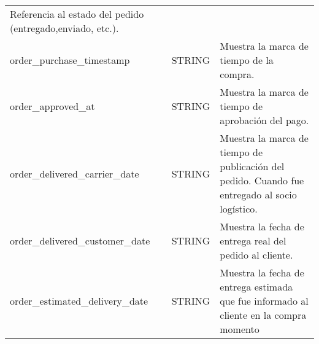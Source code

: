 \documentclass[11pt]{article}
\begin{document}
\begin{longtable}[]{@{}lll@{}}
\begin{minipage}[t]{0.30\columnwidth}
Referencia al estado del pedido (entregado,enviado, etc.).\strut
\end{minipage}\tabularnewline
\begin{minipage}[t]{0.30\columnwidth}\raggedright
order\_purchase\_timestamp\strut
\end{minipage} & \begin{minipage}[t]{0.30\columnwidth}\raggedright
STRING\strut
\end{minipage} & \begin{minipage}[t]{0.30\columnwidth}\raggedright
Muestra la marca de tiempo de la compra.\strut
\end{minipage}\tabularnewline
\begin{minipage}[t]{0.30\columnwidth}\raggedright
order\_approved\_at\strut
\end{minipage} & \begin{minipage}[t]{0.30\columnwidth}\raggedright
STRING\strut
\end{minipage} & \begin{minipage}[t]{0.30\columnwidth}\raggedright
Muestra la marca de tiempo de aprobación del pago.\strut
\end{minipage}\tabularnewline
\begin{minipage}[t]{0.30\columnwidth}\raggedright
order\_delivered\_carrier\_date\strut
\end{minipage} & \begin{minipage}[t]{0.30\columnwidth}\raggedright
STRING\strut
\end{minipage} & \begin{minipage}[t]{0.30\columnwidth}\raggedright
Muestra la marca de tiempo de publicación del pedido. Cuando fue
entregado al socio logístico.\strut
\end{minipage}\tabularnewline
\begin{minipage}[t]{0.30\columnwidth}\raggedright
order\_delivered\_customer\_date\strut
\end{minipage} & \begin{minipage}[t]{0.30\columnwidth}\raggedright
STRING\strut
\end{minipage} & \begin{minipage}[t]{0.30\columnwidth}\raggedright
Muestra la fecha de entrega real del pedido al cliente.\strut
\end{minipage}\tabularnewline
\begin{minipage}[t]{0.30\columnwidth}\raggedright
order\_estimated\_delivery\_date\strut
\end{minipage} & \begin{minipage}[t]{0.30\columnwidth}\raggedright
STRING\strut
\end{minipage} & \begin{minipage}[t]{0.30\columnwidth}\raggedright
Muestra la fecha de entrega estimada que fue informado al cliente en la
compra momento\strut
\end{minipage}\tabularnewline
\bottomrule
\end{longtable}
\end{document}
